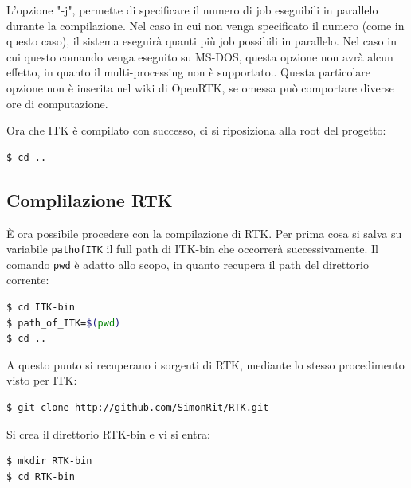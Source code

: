 \documentclass[a4paper,11pt, oneside]{article}
\begin{document}
                    L'opzione "-j", permette di specificare il numero di job eseguibili in parallelo durante la compilazione. Nel caso in cui non venga specificato il numero (come in questo caso), il sistema eseguirà quanti più job possibili in parallelo. Nel caso in cui questo comando venga eseguito su MS-DOS, questa opzione non avrà alcun effetto, in quanto il multi-processing non è supportato.\cite{-j-gnu-docs}. Questa particolare opzione non è inserita nel wiki di OpenRTK, se omessa può comportare diverse ore di computazione.
                    
                    Ora che ITK è compilato con successo, ci si riposiziona alla root del progetto:
                    \begin{lstlisting}[language=bash, frame=bt]
$ cd ..
                    \end{lstlisting}
            
            \subsection{Complilazione RTK}
                \par
                    È ora possibile procedere con la compilazione di RTK.
                    Per prima cosa si salva su variabile \texttt{path\textunderscore of\textunderscore ITK} il full path di ITK-bin che occorrerà successivamente. Il comando \texttt{pwd} è adatto allo scopo, in quanto recupera il path del direttorio corrente:
                    \begin{lstlisting}[language=bash, frame=bt]
$ cd ITK-bin
$ path_of_ITK=$(pwd)
$ cd ..
                    \end{lstlisting}
                    
                    A questo punto si recuperano i sorgenti di RTK, mediante lo stesso procedimento visto per ITK:
                    
                    \begin{lstlisting}[language=bash, frame=bt]
$ git clone http://github.com/SimonRit/RTK.git
                    \end{lstlisting}
                    
                    \bigskip
                    Si crea il direttorio RTK-bin e vi si entra:
                    \begin{lstlisting}[language=bash, frame=bt]
$ mkdir RTK-bin
$ cd RTK-bin
                    \end{lstlisting}
                    
\end{document}
